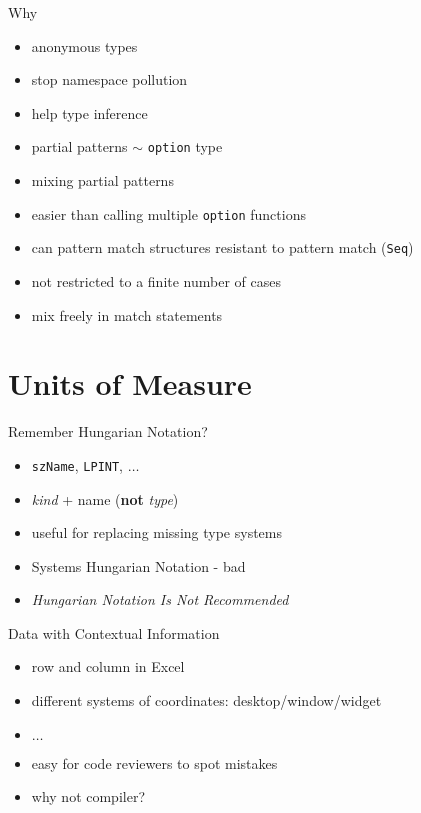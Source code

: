 \documentclass{beamer}
\begin{document}
\begin{frame}{Why}
  \begin{itemize}[<+->]
    \item anonymous types
    \item stop namespace pollution
    \item help type inference
    \item partial patterns $\sim$ \texttt{option} type
    \item mixing partial patterns
    \item easier than calling multiple \texttt{option} functions
    \item can pattern match structures resistant to pattern match (\texttt{Seq})
    \item not restricted to a finite number of cases
    \item mix freely in match statements
  \end{itemize}
\end{frame}

\section{Units of Measure}
\frame{\tableofcontents[currentsection]}

\begin{frame}{Remember Hungarian Notation?}
  \begin{itemize}[<+->]
    \item \texttt{szName}, \texttt{LPINT}, $\ldots$
    \item \textit{kind} + name (\textbf{not} \textit{type})
    \item useful for replacing missing type systems
    \item Systems Hungarian Notation - bad
    \item \textit{Hungarian Notation Is Not Recommended}
  \end{itemize}
\end{frame}

\begin{frame}{Data with Contextual Information}
  \begin{itemize}[<+->]
    \item row and column in Excel
    \item different systems of coordinates: desktop/window/widget
    \item $\ldots$
    \item easy for code reviewers to spot mistakes
    \item why not compiler?
  \end{itemize}
\end{frame}
\end{document}

